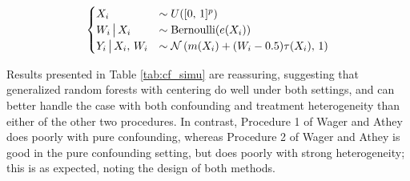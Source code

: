 \documentclass[aos]{imsart}
\theoremstyle{plain}
\theoremstyle{definition}
\theoremstyle{remark}
\begin{document}
\begin{CJK}{UTF8}{gbsn}
\begin{equation*}
\begin{cases}
X_i &\sim U([0, \, 1]^p) \\
W_i \cond X_i &\sim \text{Bernoulli}(e(X_i)) \\
Y_i \cond X_i, \, W_i &\sim \nn\p{m(X_i) + (W_i - 0.5) \tau(X_i), \, 1}
\end{cases}
\end{equation*}


Results presented in Table \ref{tab:cf_simu} are reassuring, suggesting that
generalized random forests with centering do well under both settings, and
can better handle the case with both confounding and treatment heterogeneity than
either of the other two procedures. In contrast, Procedure 1 of Wager and Athey
does poorly with pure confounding, whereas Procedure 2 of Wager and Athey
is good in the pure confounding setting, but does poorly with strong heterogeneity;
this is as expected, noting the design of both methods.



\end{CJK}
\end{document}
